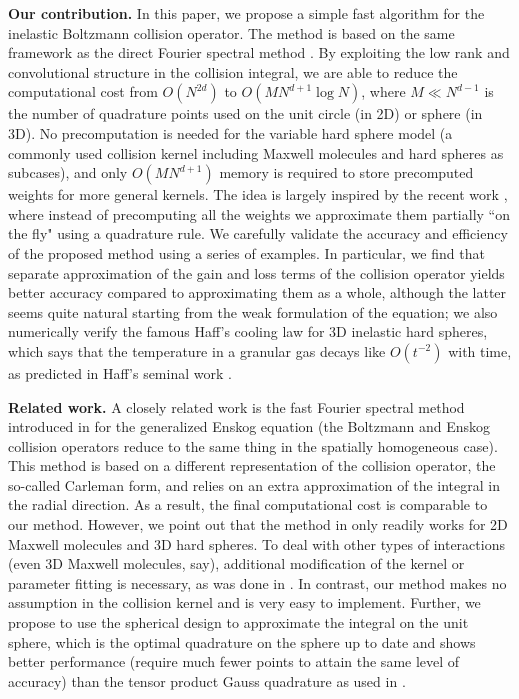 \documentclass[review, times]{elsarticle}
\begin{document}
{\bf Our contribution.} In this paper, we propose a simple fast algorithm for the inelastic Boltzmann collision operator. The method is based on the same framework as the direct Fourier spectral method \cite{FPT05}. By exploiting the low rank and convolutional structure in the collision integral, we are able to reduce the computational cost from $O(N^{2d})$ to $O(MN^{d+1}\log N)$, where $M \ll N^{d-1}$ is the number of quadrature points used on the unit circle (in 2D) or sphere (in 3D). No precomputation is needed for the variable hard sphere model (a commonly used collision kernel including Maxwell molecules and hard spheres as subcases), and only $O(MN^{d+1})$ memory is required to store precomputed weights for more general kernels. The idea is largely inspired by the recent work \cite{GHHH17}, where instead of precomputing all the weights we approximate them partially ``on the fly" using a quadrature rule. We carefully validate the accuracy and efficiency of the proposed method using a series of examples. In particular, we find that separate approximation of the gain and loss terms of the collision operator yields better accuracy compared to approximating them as a whole, although the latter seems quite natural starting from the weak formulation of the equation; we also numerically verify the famous Haff's cooling law for 3D inelastic hard spheres, which says that the temperature in a granular gas decays like $O(t^{-2})$ with time, as predicted in Haff's seminal work \cite{Haff83}.

{\bf Related work.} A closely related work is the fast Fourier spectral method introduced in \cite{WZR15} for the generalized Enskog equation (the Boltzmann and Enskog collision operators reduce to the same thing in the spatially homogeneous case). This method is based on a different representation of the collision operator, the so-called Carleman form, and relies on an extra approximation of the integral in the radial direction. As a result, the final computational cost is comparable to our method. However, we point out that the method in \cite{WZR15} only readily works for 2D Maxwell molecules and 3D hard spheres. To deal with other types of interactions (even 3D Maxwell molecules, say), additional modification of the kernel or parameter fitting is necessary, as was done in \cite{WWSRZ13}. In contrast, our method makes no assumption in the collision kernel and is very easy to implement. Further, we propose to use the spherical design \cite{Womersley} to approximate the integral on the unit sphere, which is the optimal quadrature on the sphere up to date and shows better performance (require much fewer points to attain the same level of accuracy) than the tensor product Gauss quadrature as used in \cite{WZR15}.
\end{document}
